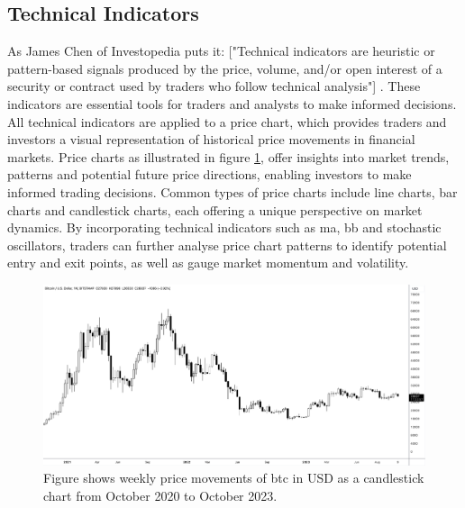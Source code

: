 \subsection{Technical Indicators}
\label{sec:TechnicalIndicators}

As James Chen of Investopedia puts it: ["Technical indicators are heuristic or pattern-based signals produced by the price, volume, and/or open interest of a security or contract used by traders who follow technical analysis"] \citep{Chen_2021}. These indicators are essential tools for traders and analysts to make informed decisions.
\newline
\newline
All technical indicators are applied to a price chart, which provides traders and investors a visual representation of historical price movements in financial markets. Price charts as illustrated in figure \ref{fig:bitcoin_price_chart}, offer insights into market trends, patterns and potential future price directions, enabling investors to make informed trading decisions. Common types of price charts include line charts, bar charts and candlestick charts, each offering a unique perspective on market dynamics. By incorporating technical indicators such as \gls{ma}, \gls{bb} and stochastic oscillators, traders can further analyse price chart patterns to identify potential entry and exit points, as well as gauge market momentum and volatility.

\begin{figure}[ht]
    \centering
    \includegraphics[width=\textwidth]{./assets/img/bitcoin_price_chart.png}
    \caption{Figure shows weekly price movements of \gls{btc} in USD as a candlestick chart from October 2020 to October 2023.}
    \label{fig:bitcoin_price_chart}
\end{figure}

